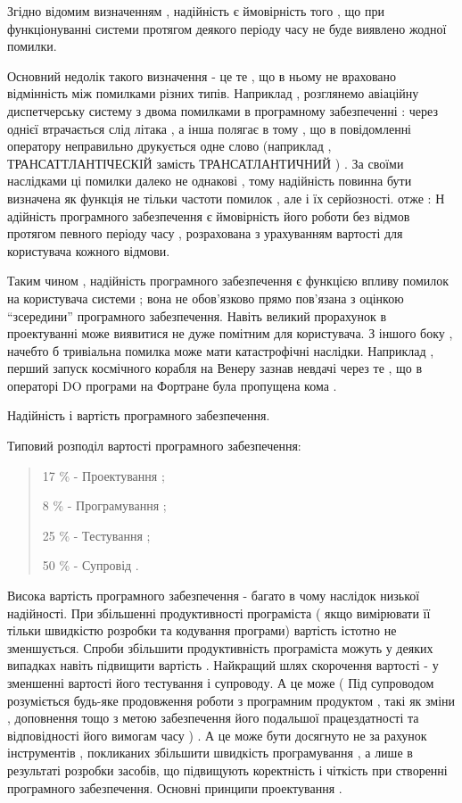 Згідно відомим визначенням , надійність є ймовірність того , що при функціонуванні системи протягом деякого періоду часу не буде виявлено жодної помилки.

Основний недолік такого визначення - це те , що в ньому не враховано відмінність між помилками різних типів. Наприклад , розглянемо авіаційну диспетчерську систему з двома помилками в програмному забезпеченні : через однієї втрачається слід літака , а інша полягає в тому , що в повідомленні оператору неправильно друкується одне слово (наприклад , ТРАНСАТТЛАНТІЧЕСКІЙ замість ТРАНСАТЛАНТИЧНИЙ ) . За своїми наслідками ці помилки далеко не однакові , тому надійність повинна бути визначена як функція не тільки частоти помилок , але і їх серйозності. отже :
Н
адійність програмного забезпечення є ймовірність його роботи без відмов протягом певного періоду часу , розрахована з урахуванням вартості для користувача кожного відмови.

Таким чином , надійність програмного забезпечення є функцією впливу помилок на користувача системи ; вона не обов'язково прямо пов'язана з оцінкою ``зсередини'' програмного забезпечення. Навіть великий прорахунок в проектуванні може виявитися не дуже помітним для користувача. З іншого боку , начебто б тривіальна помилка може мати катастрофічні наслідки. Наприклад , перший запуск космічного корабля на Венеру зазнав невдачі через те , що в операторі DO програми на Фортране була пропущена кома .

Надійність і вартість програмного забезпечення.

Типовий розподіл вартості програмного забезпечення:
\begin{quote}

17 \% - Проектування ;

8 \% - Програмування ;

25 \% - Тестування ;

50 \% - Супровід .
\end{quote}

Висока вартість програмного забезпечення - багато в чому наслідок низької надійності. При збільшенні продуктивності програміста ( якщо вимірювати її тільки швидкістю розробки та кодування програми) вартість істотно не зменшується. Спроби збільшити продуктивність програміста можуть у деяких випадках навіть підвищити вартість . Найкращий шлях скорочення вартості - у зменшенні вартості його тестування і супроводу. А це може ( Під супроводом розуміється будь-яке продовження роботи з програмним продуктом , такі як зміни , доповнення тощо з метою забезпечення його подальшої працездатності та відповідності його вимогам часу ) . А це може бути досягнуто не за рахунок інструментів , покликаних збільшити швидкість програмування , а лише в результаті розробки засобів, що підвищують коректність і чіткість при створенні програмного забезпечення.
Основні принципи проектування .

